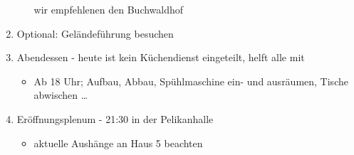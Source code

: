 \documentclass[showtrims, a4paper]{article}
\begin{document}
\begin{enumerate}
\begin{itemize}
   wir empfehlenen den Buchwaldhof
  \end{itemize}
  \item Optional: Geländeführung besuchen
  \item Abendessen - heute ist kein Küchendienst eingeteilt, helft alle mit
  \begin{itemize}
    \item Ab 18 Uhr; Aufbau, Abbau, Spühlmaschine ein- und ausräumen, Tische abwischen \dots
  \end{itemize}
  \item Eröffnungsplenum - 21:30 in der Pelikanhalle
  \begin{itemize}
    \item aktuelle Aushänge an Haus 5 beachten
  \end{itemize}
\end{enumerate}
\end{document}

